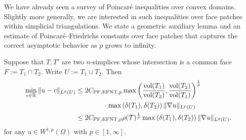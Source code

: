 \documentclass[10pt,letterpaper]{article}
\begin{document}
We have already seen a survey of Poincar\'e inequalities over convex domains. 
Slightly more generally, we are interested in such inequalities over face patches within simplicial triangulations. 
We state a geometric auxiliary lemma and an estimate of Poincar\'e--Friedrichs constants over face patches 
that captures the correct asymptotic behavior as $p$ grows to infinity.

\begin{lemma}\label{lemma:poincarefriedrichsoverfacepatch}
    Suppose that $T, T'$ are two $n$-simplices whose intersection is a common face $F := T_1 \cap T_2$. 
    Write $U := T_1 \cup T_2$. 
    Then 
    \begin{align*}
        \min\limits_{ c \in {\mathbb R} }
        \| u - c \|_{L^{p}(U)}
        &
        \leq 
        2 C_{{\rm PF},{\rm EFNT},p}
        \max\left( 
            \frac{ \operatorname{vol}(T_1) }{ \operatorname{vol}(T_2) }
            ,
            \frac{ \operatorname{vol}(T_2) }{ \operatorname{vol}(T_1) }
        \right)^{\frac 1 p}
        \\&\qquad\qquad 
        \cdot 
        \max\left( {\delta}(T_1), {\delta}(T_2) \right)
        \| \nabla u \|_{L^{p}(U)}
        \\&
        \leq 
        2 C_{{\rm PF},{\rm EFNT},p}
        \rho({\mathcal T})^{\frac 1 p}
        \max\left( {\delta}(T_1), {\delta}(T_2) \right)
        \| \nabla u \|_{L^{p}(U)}
        .
    \end{align*}
    for any $u \in W^{1,p}(\Omega)$ with $p \in [1,\infty]$.
\end{lemma}
\end{document}
